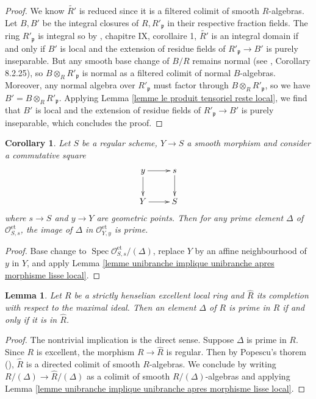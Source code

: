 \documentclass[a4paper,12pt]{amsart} %
\numberwithin{equation}{subsection}
\newcommand{\on}[1]{\operatorname{#1}}
\newcommand{\Spec}{\operatorname{Spec}}
\theoremstyle{definition}
\theoremstyle{plain}%
\newtheorem{lemma}[definition]{Lemma}
\newtheorem{corollary}[definition]{Corollary}
\theoremstyle{remark}
\renewcommand{\O}{\mathcal{O}}
\begin{document}
\begin{proof}
We know $\tilde{R'}$ is reduced since it is a filtered colimit of smooth $R$-algebras. Let $B,B'$ be the integral closures of $R,R'_\mathfrak{p}$ in their respective fraction fields. The ring $R'_\mathfrak{p}$ is integral so by \cite{Raynaud}, chapitre IX, corollaire 1, $\tilde{R'}$ is an integral domain if and only if $B'$ is local and the extension of residue fields of $R'_\mathfrak{p}\to B'$ is purely inseparable. But any smooth base change of $B/R$ remains normal (see \cite{Liu}, Corollary 8.2.25), so $B\otimes_R R'_\mathfrak{p}$ is normal as a filtered colimit of normal $B$-algebras. Moreover, any normal algebra over $R'_\mathfrak{p}$ must factor through $B\otimes_R R'_\mathfrak{p}$, so we have $B'=B\otimes_R R'_\mathfrak{p}$. Applying Lemma \ref{lemme le produit tensoriel reste local}, we find that $B'$ is local and the extension of residue fields of $R'_\mathfrak{p}\to B'$ is purely inseparable, which concludes the proof.
\end{proof}

\begin{corollary}\label{corollary:irred_of_etale_loc_ring_stable_under_smooth_maps}
Let $S$ be a regular scheme, $Y\to S$ a smooth morphism and consider a commutative square
\[
\xymatrix{
y \ar[r]\ar[d] 	& s \ar[d] \\
Y \ar[r]		& S
}
\]
where $s \to S$ and $y \to Y$ are geometric points. Then for any prime element $\Delta$ of $\O_{S,s}^{\on{et}}$, the image of $\Delta$ in $\O_{Y,y}^{\on{et}}$ is prime.
\end{corollary}

\begin{proof}
Base change to $\Spec\O_{S,s}^{\on{et}}/(\Delta)$, replace $Y$ by an affine neighbourhood of $y$ in $Y$, and apply Lemma \ref{lemme unibranche implique unibranche apres morphisme lisse local}.
\end{proof}

\begin{lemma}\label{lemme les irreductibles au complete sont les irreductibles}
	Let $R$ be a strictly henselian excellent local ring and $\widehat{R}$ its completion with respect to the maximal ideal. Then an element $\Delta$ of $R$ is prime in $R$ if and only if it is in $\widehat{R}$.
\end{lemma}

\begin{proof}
The nontrivial implication is the direct sense. Suppose $\Delta$ is prime in $R$. Since $R$ is excellent, the morphism $R\to \widehat{R}$ is regular. Then by  Popescu's thorem (\cite[\href{http://stacks.math.columbia.edu/tag/07GB}{Tag 07GB}]{stacks-project}), $\widehat{R}$ is a directed colimit of smooth $R$-algebras. We conclude by writing $R/(\Delta) \to \widehat{R}/(\Delta)$ as a colimit of smooth $R/(\Delta)$-algebras and applying Lemma \ref{lemme unibranche implique unibranche apres morphisme lisse local}.
\end{proof}
\end{document}

